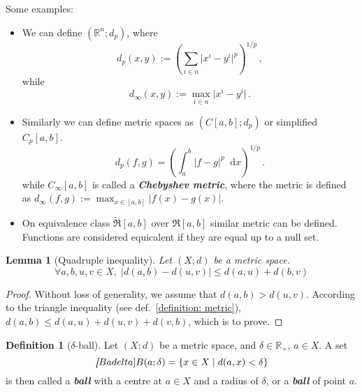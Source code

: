 \documentclass[openany]{book}
\newcommand*{\indexbf}[1]{\emph{\textbf{#1}}\index{#1}} %
\theoremstyle{plain}
\newtheorem{lemma}{Lemma} %
\theoremstyle{definition}
\newtheorem{definition}{Definition}[section] %
\newcommand{\dif}{\mathop{}\!\mathrm{d}} %
\newcommand{\emphbf}[1]{\emph{\textbf{#1}}}
\begin{document}
Some examples:
\begin{itemize}
	\item 
	We can define $(\mathbb R^n; d_p)$, where
	\begin{equation}\label{equation:d_p}
		d_p (x, y) := \left(
			\sum_{i \in n}\big|x^i - y^i \big|^p \right)^{1/p}\,,
	\end{equation}
	while
	\begin{equation}\label{equation:d_infty}
		d_\infty (x, y) :=
		\max_{i \in n} \big|x^i - y^i\big|\,.
	\end{equation}
	\item 
	Similarly we can define metric spaces as $(C[a, b]; d_p)$ or simplified $C_p[a, b]$. 
	\begin{equation}
		d_p(f, g) =
		\left(
			\int^b_a \big| f - g \big|^p \dif x
		\right) ^{1/p}\,.
	\end{equation}
	while $C_\infty[a, b]$ is called a \indexbf{Chebyshev metric}, 
	where the metric is defined as $d_\infty(f, g) := \max_{x \in [a, b]} |f(x) - g(x)|$.
	\item 
	On equivalence class $\tilde {\mathfrak R}[a,b]$ over $\mathfrak R[a,b]$ similar metric can be defined. 
	Functions are considered equicalent if they are equal up to a null set. 
\end{itemize}

\begin{lemma}[Quadruple inequality]\label{lemma: quadruple inequality}
	Let $(X;d)$ be a metric space. 
	\begin{equation}\label{equation: quadruple inequality}
		\forall a, b, u, v \in X,\; \big| d(a, b) - d(u, v) \big| \leq d(a, u) + d(b, v) 
	\end{equation}
\end{lemma}
\begin{proof}
	Without loss of generality, we assume that $d(a, b) > d(u, v)$. 
	According to the triangle inequality (see def.~\ref{definition: metric}), $d(a, b) \leq d(a, u) + d(u, v) + d(v,b)$, which is to prove.  
\end{proof}

\begin{definition}[$\delta$-ball]\label{definition: delta ball}
	Let $(X; d)$ be a metric space, and $\delta \in \mathbb R_+$, $a \in X$. 
	A set
	\begin{equation*}
		\indexbf[B a delta]{B(a; \delta)} = \{x \in X \mid d(a, x) < \delta\}
	\end{equation*}
	is then called a \indexbf{ball} with a centre at $a \in X$ and a radius of $\delta$, or a \emphbf{ball} of point $a$.
\end{definition}
\end{document}
